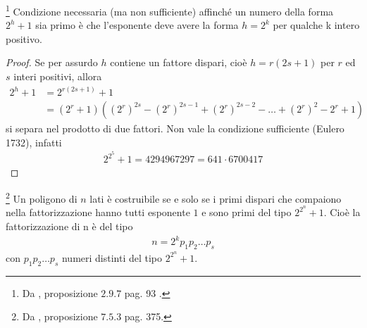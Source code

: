 \begin{lemmax}\footnote{Da \cite{cattaneo}, proposizione $2.9.7$ pag. 93 .}\label{lemmasecondo}
Condizione necessaria (ma non sufficiente) affinché un numero della forma $2^h + 1$ sia primo è che l'esponente deve avere la forma $h = 2^k$ per qualche k intero positivo.
\end{lemmax}

\begin{proof}
Se per assurdo $h$ contiene un fattore dispari, cioè $h = r(2s+1)$ per $r$ ed $s$ interi positivi, allora 
\begin{align*} 
2^h + 1& = 2^{r(2s+1)} +1 \\
& = (2^r +1)((2^r)^{2s} - (2^r)^{2s-1} + (2^r)^{2s-2} - \dots + (2^r)^{2} - 2^r + 1)
\end{align*}
si separa nel prodotto di due fattori. Non vale la condizione sufficiente (Eulero 1732), infatti
\begin{align*}  
2^{2^{5}} + 1 = 4294967297 = 641 \cdot 6700417
\end{align*}
\end{proof}


\begin{teorema}\footnote{Da \cite{cattaneo}, proposizione $7.5.3$ pag. 375. } \label{teoremaciclotomia}
Un poligono di $n$ lati è costruibile se e solo se i primi dispari che compaiono nella fattorizzazione hanno tutti esponente $1$ e sono primi del tipo $2^{2^{n}} +1$. Cioè la fattorizzazione di n è del tipo
\begin{align*} 
n = 2^k p_1 p_2 \dots p_s
\end{align*}
con $p_1 p_2 \dots p_s$ numeri distinti del tipo $2^{2^{n}} +1$.
\end{teorema}

